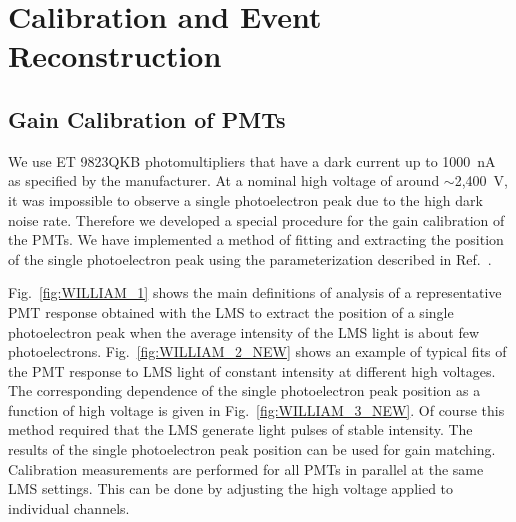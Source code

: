 \section{Calibration and Event Reconstruction}

\subsection{Gain Calibration of PMTs} 

We use ET 9823QKB photomultipliers that have a dark current up to 1000~nA as specified by the manufacturer.
At a nominal high voltage of around $\sim$2,400~V, it was impossible to observe a single photoelectron peak due
to the high dark noise rate. Therefore we developed a special procedure for the gain calibration of the PMTs. We
have implemented a method of fitting and extracting the position of the single photoelectron peak using the
parameterization described in Ref.~\cite{bellamy1996}.

 
Fig.~\ref{fig:WILLIAM_1} shows the main definitions of analysis of a representative PMT response obtained
with the LMS to extract the  position of a single photoelectron peak when the average intensity of the LMS light
is about few photoelectrons. Fig.~\ref{fig:WILLIAM_2_NEW} shows an example of typical fits of the PMT
response to LMS light of constant intensity at different high voltages. The corresponding dependence of the single
photoelectron peak position as a function of high voltage is given in Fig.~\ref{fig:WILLIAM_3_NEW}. Of course
this method required that the LMS generate light pulses of stable intensity. The results of the single photoelectron
peak position can be used for gain matching. Calibration measurements are performed for all PMTs in parallel at the
same LMS settings. This can be done by adjusting the high voltage applied to individual channels.

